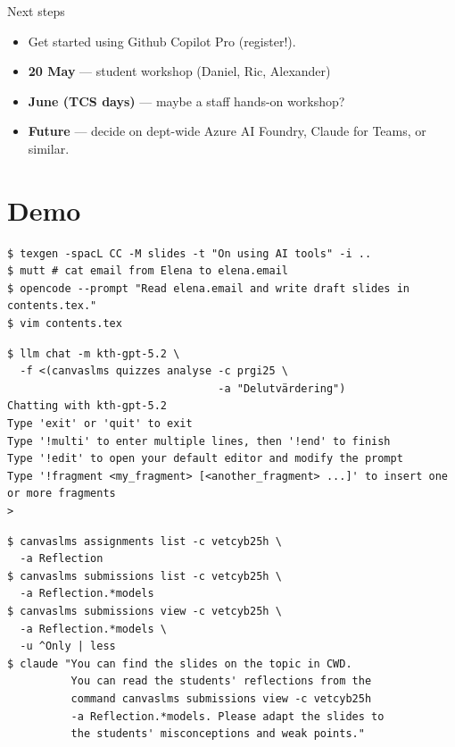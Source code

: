\begin{frame}
  \begin{block}{Next steps}
    \begin{itemize}
      \item Get started using Github Copilot Pro (register!).
      \item \textbf{20 May} --- student workshop (Daniel, Ric, Alexander)
      \item \textbf{June (TCS days)} --- maybe a staff hands-on workshop?
      \item \textbf{Future} --- decide on dept-wide Azure AI Foundry, Claude 
        for Teams, or similar.
    \end{itemize}
  \end{block}
\end{frame}


\section{Demo}

\begin{frame}[fragile]
  \begin{verbatim}
$ texgen -spacL CC -M slides -t "On using AI tools" -i ..
$ mutt # cat email from Elena to elena.email
$ opencode --prompt "Read elena.email and write draft slides in contents.tex."
$ vim contents.tex
  \end{verbatim}
\end{frame}

\begin{frame}[fragile]
  \begin{verbatim}
$ llm chat -m kth-gpt-5.2 \
  -f <(canvaslms quizzes analyse -c prgi25 \
                                 -a "Delutvärdering")
Chatting with kth-gpt-5.2
Type 'exit' or 'quit' to exit
Type '!multi' to enter multiple lines, then '!end' to finish
Type '!edit' to open your default editor and modify the prompt
Type '!fragment <my_fragment> [<another_fragment> ...]' to insert one or more fragments
>
  \end{verbatim}
\end{frame}

\begin{frame}[fragile]
  \begin{verbatim}
$ canvaslms assignments list -c vetcyb25h \
  -a Reflection
$ canvaslms submissions list -c vetcyb25h \
  -a Reflection.*models
$ canvaslms submissions view -c vetcyb25h \
  -a Reflection.*models \
  -u ^Only | less
$ claude "You can find the slides on the topic in CWD.
          You can read the students' reflections from the
          command canvaslms submissions view -c vetcyb25h
          -a Reflection.*models. Please adapt the slides to
          the students' misconceptions and weak points."
  \end{verbatim}
\end{frame}

